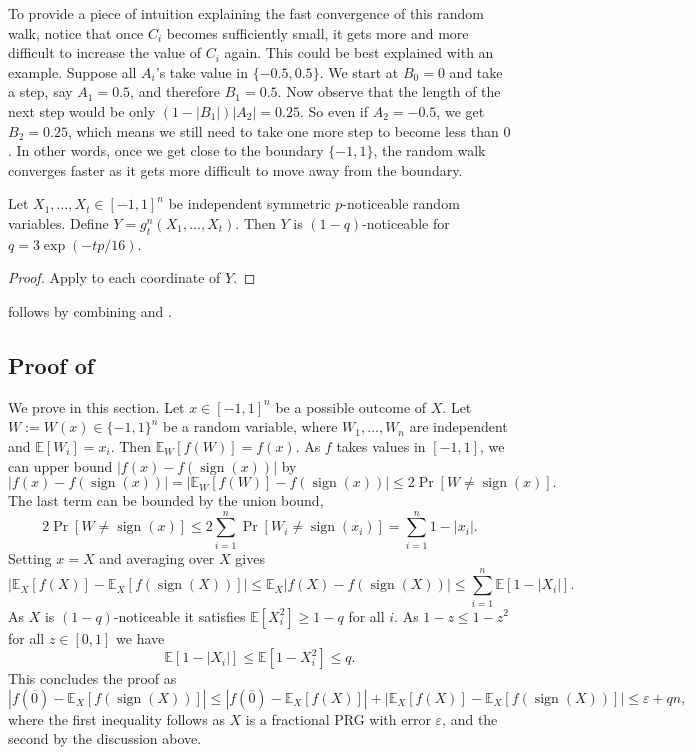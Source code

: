 \documentclass{toc}
\newcommand{\E}{\mathbb{E}}
\newcommand{\eps}{\varepsilon}
\DeclareMathOperator{\sign}{sign}     %
\newcommand{\zero}{\overline{0}}
\begin{document}
To provide a piece of intuition explaining the fast convergence of this random walk, notice that once $C_i$ becomes sufficiently small, it gets more and more difficult to increase the value of $C_i$ again. This could be best explained with an example. Suppose all $A_i$'s take value in $\{-0.5,0.5\}$. We start at $B_0 = 0$ and take a step, say $A_1 = 0.5$, and therefore $B_1 = 0.5$. Now observe that the length of the next step would be only $(1-|B_1|)|A_2| = 0.25$. So even if $A_2 = -0.5$, we get $B_2 = 0.25$, which means we still need to take one more step to become less than $0$.  In other words, once we get close to the boundary $\{-1,1\}$, the random walk  converges faster as it gets more difficult to move away from the boundary.

\begin{corollary}
\label{cor:polar}
Let $X_1,\ldots,X_t \in [-1,1]^n$ be independent symmetric $p$-noticeable random variables. Define
$Y=g_t^n(X_1,\ldots,X_t)$.
Then $Y$ is $(1-q)$-noticeable for $q=3 \exp(-tp/16)$.
\end{corollary}

\begin{proof}
Apply  to each coordinate of $Y$.
\end{proof}

 follows by combining  and .

\subsection{Proof of }
We prove  in this section.
Let $x \in [-1,1]^n$ be a possible outcome of $X$. Let $W:=W(x) \in \{-1,1\}^n$
be a random variable, where $W_1,\ldots,W_n$ are independent and $\E[W_i]=x_i$. Then $\E_W[f(W)] = f(x)$.
As $f$ takes values in $[-1,1]$, we can upper bound $|f(x)-f(\sign(x))|$ by
$$
|f(x) - f(\sign(x))| = |\E_W [f(W)] - f(\sign(x))| \le 2\Pr[W \ne \sign(x)].
$$
The last term can be bounded by the union bound,
$$
2\Pr[W \ne \sign(x)] \le 2\sum_{i=1}^n \Pr[W_i \ne \sign(x_i)] = \sum_{i=1}^n 1-|x_i|.
$$
Setting $x=X$ and averaging over $X$ gives
$$
|\E_X [f(X)] - \E_X [f(\sign(X))]| \le
\E_X|f(X) - f(\sign(X))| \le
 \sum_{i=1}^n \E[1-|X_i|].
$$
As $X$ is $(1-q)$-noticeable it satisfies $\E[X_i^2] \ge 1-q$ for all $i$.
As $1-z \le 1-z^2$ for all $z \in [0,1]$ we have
$$
\E[1-|X_i|] \le \E[1-X_i^2] \le q.
$$
This concludes the proof as
$$
|f(\zero) - \E_X [f(\sign(X))]| \le
|f(\zero) - \E_X [f(X)]|+|\E_X [f(X)] - \E_X [f(\sign(X))]| \le \eps+qn,
$$
where the first inequality follows as $X$ is a fractional PRG with
error $\eps$, and the second by the discussion above.
\end{document}
